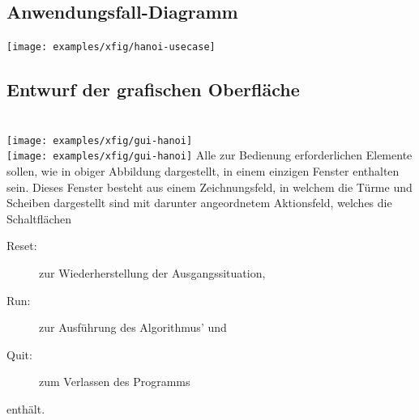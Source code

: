 \subsection{Anwendungsfall-Diagramm}
\begin{center}
\texttt{[image: examples/xfig/hanoi-usecase]}
\end{center}
\ifslides
\newpage
\fi
\subsection{Entwurf der grafischen Oberfläche}\ \\[2ex]
\ifslides
\texttt{[image: examples/xfig/gui-hanoi]}\\
\else
\texttt{[image: examples/xfig/gui-hanoi]}
\fi
Alle zur Bedienung erforderlichen Elemente sollen, wie in obiger Abbildung
dargestellt, in einem einzigen Fenster enthalten sein. 
Dieses Fenster besteht aus einem Zeichnungsfeld,
in welchem die Türme und Scheiben dargestellt sind mit darunter 
angeordnetem Aktionsfeld, welches die Schaltflächen
\begin{description}
\item[Reset:] zur Wiederherstellung der Ausgangssituation, 
\item[Run:] zur Ausführung des Algorithmus' und 
\item[Quit:] zum Verlassen des Programms
\end{description} enthält. 

